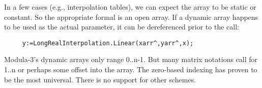 In a few cases (e.g., interpolation tables), we can expect
the array to be static or constant.  So the appropriate
formal is an open array.
If a dynamic array happens to be used as the actual parameter,
it can be dereferenced prior to the call:

\begin{tt} \begin{verbatim}
     y:=LongRealInterpolation.Linear(xarr^,yarr^,x);
\end{verbatim} \end{tt}

Modula-3's dynamic arrays only range 0..n-1.
But many matrix notations call for 1..n or
perhaps some offset into the array.
The zero-based indexing has proven to be the most universal.
There is no support for other schemes.
